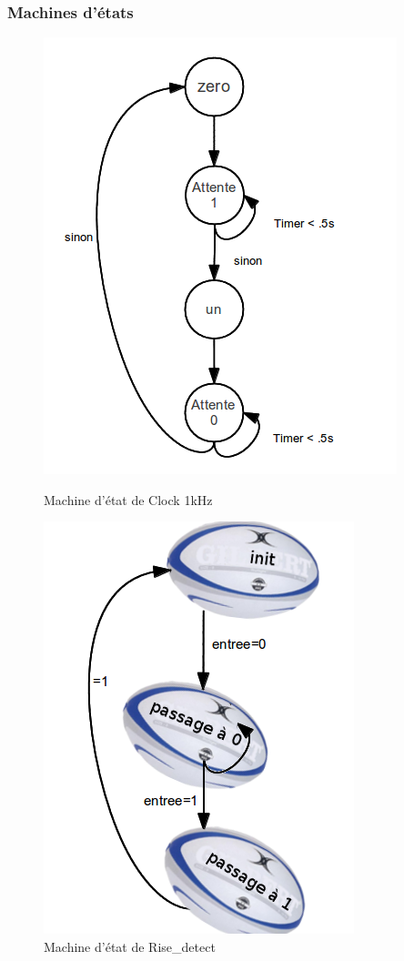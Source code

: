 \documentclass[a4paper,11pt]{article}
\begin{document}
  \subsubsection{Machines d'états}

\begin{figure}[H]
   \begin{minipage}[b]{0.40\linewidth}
      \centering \includegraphics[scale=.6]{machine_1Hz.png}
      \caption{Machine d'état de Clock 1kHz}
   \end{minipage}\hfill
   \begin{minipage}[b]{0.40\linewidth}   
      \centering \includegraphics[scale=.6]{machine_front.png}
      \caption{Machine d'état de Rise\_detect}
   \end{minipage}
 \end{figure}
\end{document}
